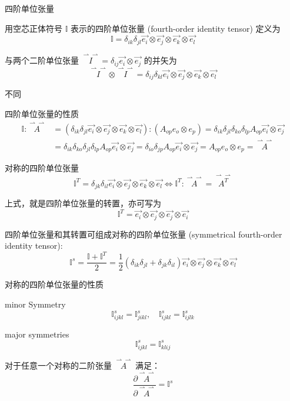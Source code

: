 \documentclass[12pt, a4paper, oneside, UTF8]{ctexbook}  %
\newcommand{\vvec}{\overset{\rightharpoonup\!\!\!\! \rightharpoonup}}
\begin{document}
\begin{defn}
    四阶单位张量

    用空芯正体符号 $\mathbb{I}$ 表示的四阶单位张量 (fourth-order identity tensor) 定义为
    \[
    \mathbb{I} = \delta_{ik}\delta_{jl}\vec{e_i} \otimes \vec{e_j} \otimes \vec{e_k} \otimes \vec{e_l}
    \]
    
    与两个二阶单位张量 $\vvec{I} = \delta_{ij}\vec{e_i} \otimes \vec{e_j}$ 的并矢为
    \[
    \vvec{I} \otimes \vvec{I} = \delta_{ij}\delta_{kl}\vec{e_i} \otimes \vec{e_j} \otimes \vec{e_k} \otimes \vec{e_l}
    \]

    不同

    四阶单位张量的性质
    \begin{align*}
\mathbb{I}: \vvec{A}& = (\delta_{ik}\delta_{jl}\vec{e_i} \otimes \vec{e_j} \otimes \vec{e_k} \otimes \vec{e_l}) : (A_{op}e_o \otimes e_p) = \delta_{ik}\delta_{jl}\delta_{ko}\delta_{lp}A_{op}\vec{e_i} \otimes \vec{e_j}\\
&= \delta_{ik}\delta_{ko}\delta_{jl}\delta_{lp}A_{op}\vec{e_i} \otimes \vec{e_j} = \delta_{io}\delta_{jp}A_{op}\vec{e_i} \otimes \vec{e_j} = A_{op}e_o \otimes e_p = \vvec{A}
    \end{align*}
\end{defn}
\begin{defn}
    对称的四阶单位张量
\[
\mathbb{I}^T = \delta_{jk} \delta_{il} \vec{e_i} \otimes \vec{e_j}\otimes \vec{e_k} \otimes \vec{e_l}  \Leftrightarrow  \mathbb{I}^T : \vvec{A} = \vvec{A^T}
\]

上式，就是四阶单位张量的转置，亦可写为
\[
\mathbb{I}^T = \vec{e_i} \otimes \vec{e_j} \otimes \vec{e_j} \otimes \vec{e_i}
\]

四阶单位张量和其转置可组成对称的四阶单位张量 (symmetrical fourth-order identity tensor):
\[
\mathbb{I}^s = \frac{\mathbb{I} + \mathbb{I}^T}{2} = \frac{1}{2} (\delta_{ik} \delta_{jl} + \delta_{jk} \delta_{il}) \vec{e_i} \otimes \vec{e_j} \otimes \vec{e_k} \otimes \vec{e_l}
\]

对称的四阶单位张量的性质

minor Symmetry
\[
\mathbb{I}_{ijkl}^s = \mathbb{I}_{jikl}^s, \quad \mathbb{I}_{ijkl}^s = \mathbb{I}_{ijlk}^s
\]

major symmetries
\[
\mathbb{I}_{ijkl}^s = \mathbb{I}_{klij}^s
\]

对于任意一个对称的二阶张量 $\vvec{A}$ 满足：
\[
\frac{\partial \vvec{A}}{\partial \vvec{A}} = \mathbb{I}^s
\]
\end{defn}
\end{document}
